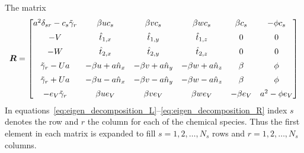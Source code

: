 The matrix 
\large
\begin{equation}
\bt{R}=
\begin{bmatrix}
  a^2\delta_{sr}-c_s\tilde{\gamma}_r               & \beta u c_s           & \beta v c_s           & \beta w c_s          & \beta c_s   & -\phi c_s \vspace{.5em} \\
  -V                                              & \hat{t}_{1,x}         & \hat{t}_{1,y}          & \hat{t}_{1,z}         & 0           & 0         \vspace{.5em} \\
  -W                                              & \hat{t}_{2,x}         & \hat{t}_{2,y}          & \hat{t}_{2,z}         & 0           & 0         \vspace{.5em} \\
  \tilde{\gamma}_r-Ua                             & -\beta u + a\hat{n}_x & -\beta v + a\hat{n}_y & -\beta w + a\hat{n}_z & \beta      & \phi       \vspace{.5em} \\  
  \tilde{\gamma}_r+Ua                             & -\beta u - a\hat{n}_x & -\beta v - a\hat{n}_y & -\beta w - a\hat{n}_z & \beta      & \phi       \vspace{.5em} \\  
  -e_V\tilde{\gamma}_r                            & \beta u e_V           & \beta v e_V           & \beta w e_V           & -\beta e_V & a^2 - \phi e_V
\end{bmatrix}
\label{eq:eigen_decomposition_R}
\end{equation}
\normalsize
In equations~\eqref{eq:eigen_decomposition_L}--\eqref{eq:eigen_decomposition_R} index $s$ denotes the row and $r$ the column for each of the chemical species.  Thus the first element in each matrix is expanded to fill $s=1,2,\ldots,N_s$ rows and $r=1,2,\ldots,N_s$ columns.









